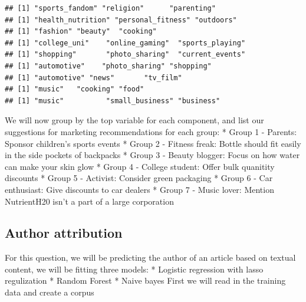 \documentclass[]{article}
\begin{document}
\begin{verbatim}
## [1] "sports_fandom" "religion"      "parenting"    
## [1] "health_nutrition" "personal_fitness" "outdoors"        
## [1] "fashion" "beauty"  "cooking"
## [1] "college_uni"    "online_gaming"  "sports_playing"
## [1] "shopping"       "photo_sharing"  "current_events"
## [1] "automotive"    "photo_sharing" "shopping"     
## [1] "automotive" "news"       "tv_film"   
## [1] "music"   "cooking" "food"   
## [1] "music"          "small_business" "business"
\end{verbatim}

We will now group by the top variable for each component, and list our
suggestions for marketing recommendations for each group: * Group 1 -
Parents: Sponsor children's sports events * Group 2 - Fitness freak:
Bottle should fit easily in the side pockets of backpacks * Group 3 -
Beauty blogger: Focus on how water can make your skin glow * Group 4 -
College student: Offer bulk quanitity discounts * Group 5 - Activist:
Consider green packaging * Group 6 - Car enthusiast: Give discounts to
car dealers * Group 7 - Music lover: Mention NutrientH20 isn't a part of
a large corporation

\hypertarget{author-attribution}{%
\subsection{Author attribution}\label{author-attribution}}

For this question, we will be predicting the author of an article based
on textual content, we will be fitting three models: * Logistic
regression with lasso regulization * Random Forest * Naive bayes First
we will read in the training data and create a corpus
\end{document}
